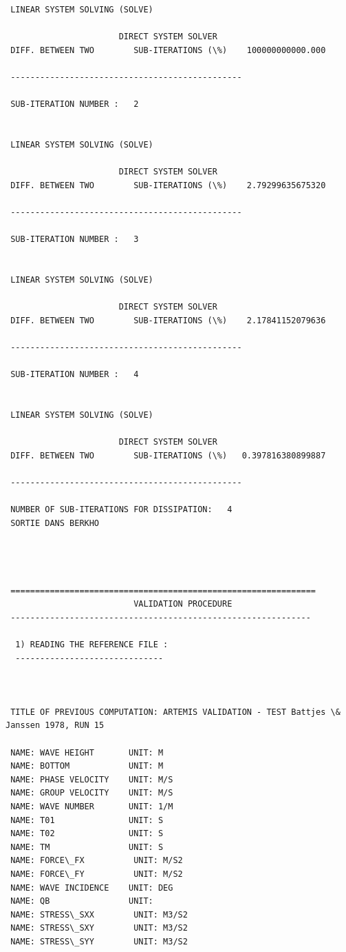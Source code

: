\begin{verbatim}
 LINEAR SYSTEM SOLVING (SOLVE)

                       DIRECT SYSTEM SOLVER
 DIFF. BETWEEN TWO        SUB-ITERATIONS (\%)    100000000000.000

 -----------------------------------------------

 SUB-ITERATION NUMBER :   2


 LINEAR SYSTEM SOLVING (SOLVE)

                       DIRECT SYSTEM SOLVER
 DIFF. BETWEEN TWO        SUB-ITERATIONS (\%)    2.79299635675320

 -----------------------------------------------

 SUB-ITERATION NUMBER :   3


 LINEAR SYSTEM SOLVING (SOLVE)

                       DIRECT SYSTEM SOLVER
 DIFF. BETWEEN TWO        SUB-ITERATIONS (\%)    2.17841152079636

 -----------------------------------------------

 SUB-ITERATION NUMBER :   4


 LINEAR SYSTEM SOLVING (SOLVE)

                       DIRECT SYSTEM SOLVER
 DIFF. BETWEEN TWO        SUB-ITERATIONS (\%)   0.397816380899887

 -----------------------------------------------

 NUMBER OF SUB-ITERATIONS FOR DISSIPATION:   4
 SORTIE DANS BERKHO




 ==============================================================
                          VALIDATION PROCEDURE
 -------------------------------------------------------------

  1) READING THE REFERENCE FILE :
  ------------------------------



 TITLE OF PREVIOUS COMPUTATION: ARTEMIS VALIDATION - TEST Battjes \& Janssen 1978, RUN 15

 NAME: WAVE HEIGHT       UNIT: M
 NAME: BOTTOM            UNIT: M
 NAME: PHASE VELOCITY    UNIT: M/S
 NAME: GROUP VELOCITY    UNIT: M/S
 NAME: WAVE NUMBER       UNIT: 1/M
 NAME: T01               UNIT: S
 NAME: T02               UNIT: S
 NAME: TM                UNIT: S
 NAME: FORCE\_FX          UNIT: M/S2
 NAME: FORCE\_FY          UNIT: M/S2
 NAME: WAVE INCIDENCE    UNIT: DEG
 NAME: QB                UNIT:
 NAME: STRESS\_SXX        UNIT: M3/S2
 NAME: STRESS\_SXY        UNIT: M3/S2
 NAME: STRESS\_SYY        UNIT: M3/S2


\end{verbatim}
